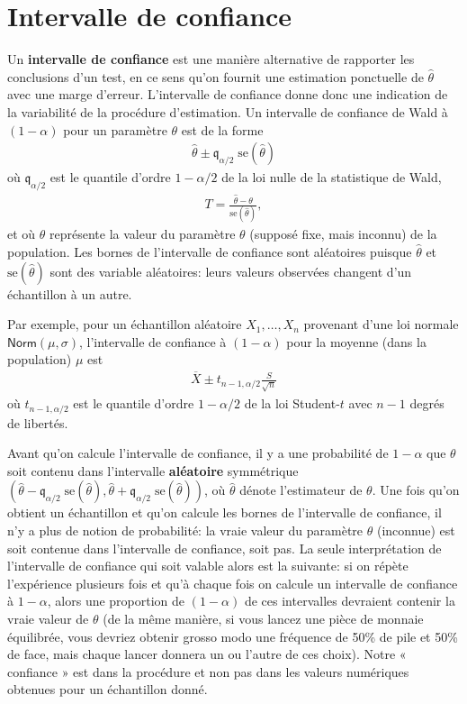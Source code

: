 \documentclass[
  11pt,
  letterpaper,
]{scrbook}
\theoremstyle{definition}
\theoremstyle{definition}
\theoremstyle{remark}
\begin{document}
\section{Intervalle de confiance}\label{intervalle-de-confiance}

Un \textbf{intervalle de confiance} est une manière alternative de
rapporter les conclusions d'un test, en ce sens qu'on fournit une
estimation ponctuelle de \(\hat{\theta}\) avec une marge d'erreur.
L'intervalle de confiance donne donc une indication de la variabilité de
la procédure d'estimation. Un intervalle de confiance de Wald à
\((1-\alpha)\) pour un paramètre \(\theta\) est de la forme
\begin{align*}
\widehat{\theta} \pm \mathfrak{q}_{\alpha/2} \; \mathrm{se}(\widehat{\theta})
\end{align*} où \(\mathfrak{q}_{\alpha/2}\) est le quantile d'ordre
\(1-\alpha/2\) de la loi nulle de la statistique de Wald, \begin{align*}
T =\frac{\widehat{\theta}-\theta}{\mathrm{se}(\widehat{\theta})},
\end{align*} et où \(\theta\) représente la valeur du paramètre
\(\theta\) (supposé fixe, mais inconnu) de la population. Les bornes de
l'intervalle de confiance sont aléatoires puisque \(\widehat{\theta}\)
et \(\mathrm{se}(\widehat{\theta})\) sont des variable aléatoires: leurs
valeurs observées changent d'un échantillon à un autre.

Par exemple, pour un échantillon aléatoire \(X_1, \ldots, X_n\)
provenant d'une loi normale \(\mathsf{Norm}(\mu, \sigma)\), l'intervalle
de confiance à \((1-\alpha)\) pour la moyenne (dans la population)
\(\mu\) est \begin{align*}
\overline{X} \pm t_{n-1, \alpha/2} \frac{S}{\sqrt{n}}
\end{align*} où \(t_{n-1, \alpha/2}\) est le quantile d'ordre
\(1-\alpha/2\) de la loi Student-\(t\) avec \(n-1\) degrés de libertés.

Avant qu'on calcule l'intervalle de confiance, il y a une probabilité de
\(1-\alpha\) que \(\theta\) soit contenu dans l'intervalle
\textbf{aléatoire} symmétrique
\((\widehat{\theta} - \mathfrak{q}_{\alpha/2} \; \mathrm{se}(\widehat{\theta}), \widehat{\theta} + \mathfrak{q}_{\alpha/2} \; \mathrm{se}(\widehat{\theta}))\),
où \(\widehat{\theta}\) dénote l'estimateur de \(\theta\). Une fois
qu'on obtient un échantillon et qu'on calcule les bornes de l'intervalle
de confiance, il n'y a plus de notion de probabilité: la vraie valeur du
paramètre \(\theta\) (inconnue) est soit contenue dans l'intervalle de
confiance, soit pas. La seule interprétation de l'intervalle de
confiance qui soit valable alors est la suivante: si on répète
l'expérience plusieurs fois et qu'à chaque fois on calcule un intervalle
de confiance à \(1-\alpha\), alors une proportion de \((1-\alpha)\) de
ces intervalles devraient contenir la vraie valeur de \(\theta\) (de la
même manière, si vous lancez une pièce de monnaie équilibrée, vous
devriez obtenir grosso modo une fréquence de 50\% de pile et 50\% de
face, mais chaque lancer donnera un ou l'autre de ces choix). Notre «
confiance » est dans la procédure et non pas dans les valeurs numériques
obtenues pour un échantillon donné.
\end{document}
